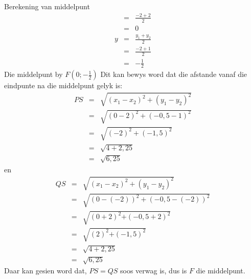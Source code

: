 \begin{wex}{Berekening van middelpunt}
{\begin{eqnarray*}
& = & \frac{-2 + 2}{2} \\ 
& = & 0 \\ 
y & = & \frac{{y}_{1} + {y}_{2}}{2} \\ 
& = & \frac{-2 + 1}{2} \\ 
& = & -\frac{1}{2} 
\end{eqnarray*}
Die middelpunt by $F(0;-\frac{1}{2})$
Dit kan bewys word dat die afstande vanaf die eindpunte na die middelpunt gelyk is: 
\begin{eqnarray*}
PS & = & \sqrt{{({x}_{1} - {x}_{2})}^{2} + {({y}_{1} - {y}_{2})}^{2}} \\ 
& = & \sqrt{{(0 - 2)}^{2} + {(-0,5 - 1)}^{2}} \\ 
& = & \sqrt{{(-2)}^{2} + {(-1,5)}^{2}} \\ 
& = & \sqrt{4 + 2,25} \\ 
& = & \sqrt{6,25}
\end{eqnarray*}
en
\begin{eqnarray*}
QS & = & \sqrt{{({x}_{1} - {x}_{2})}^{2} + {({y}_{1} - {y}_{2})}^{2}} \\ 
& = & \sqrt{{(0 - (-2))}^{2} + {(-0,5 - (-2))}^{2}} \\ 
& = & \sqrt{{(0 + 2)}^{2}{+(-0,5 + 2)}^{2}} \\ 
& = & \sqrt{{(2)}^{2}{+(-1,5)}^{2}} \\ 
& = & \sqrt{4 + 2,25} \\ 
& = & \sqrt{6,25}
\end{eqnarray*}
Daar kan gesien word dat, $PS=QS$ soos verwag is, dus is $F$ die middelpunt. 
}
\end{wex}

